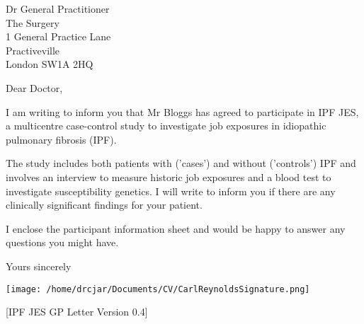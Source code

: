 \documentclass[imperial,letterpaper,pagesize,UScommercial9]{scrlttr2}
\begin{document}
\begin{letter}{Dr General Practitioner \\ The Surgery \\ 1 General Practice Lane \\ Practiveville \\ London SW1A 2HQ}


\opening{Dear Doctor,}

    I am writing to inform you that Mr Bloggs has agreed to participate in IPF JES, a multicentre case-control study to investigate job exposures in idiopathic pulmonary fibrosis (IPF).
    
    The study includes both patients with ('cases') and without ('controls') IPF and involves an interview to measure historic job exposures and a blood test to investigate susceptibility genetics. I will write to inform you if there are any clinically significant findings for your patient. 
    
    I enclose the participant information sheet and would be happy to answer any questions you might have.




\closing{Yours sincerely}

    \texttt{[image: /home/drcjar/Documents/CV/CarlReynoldsSignature.png]}

    \vfill \hfill [IPF JES GP Letter Version 0.4]

\end{letter}
\end{document}
